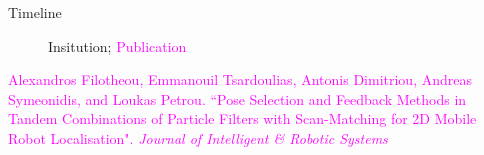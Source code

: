 \begin{frame}{Timeline}

\begin{figure}[t!] \centering
        
        \caption{\textcolor[RGB]{32,74,135}{Insitution}; \textcolor{magenta}{Publication}}
\end{figure}

\placebottom \tiny
\textcolor{magenta}{Alexandros Filotheou, Emmanouil Tsardoulias, Antonis Dimitriou, Andreas Symeonidis, and
Loukas Petrou. ``Pose Selection and Feedback Methods in Tandem Combinations of Particle Filters
with Scan-Matching for 2D Mobile Robot Localisation".  \textit{Journal of Intelligent \& Robotic Systems}}

\end{frame}
